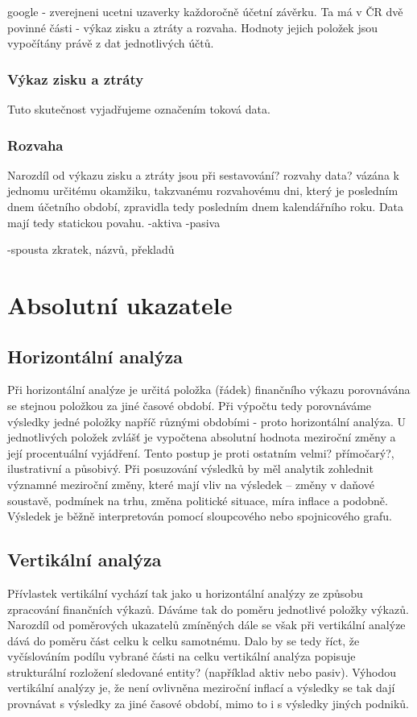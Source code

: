 google - zverejneni ucetni uzaverky
každoročně účetní závěrku. Ta má v ČR dvě povinné části - výkaz zisku a ztráty a rozvaha. Hodnoty jejich položek jsou vypočítány právě z dat jednotlivých účtů.
\subsubsection{Výkaz zisku a ztráty}
Tuto skutečnost vyjadřujeme označením toková data.

\subsubsection{Rozvaha}
Narozdíl od výkazu zisku a ztráty jsou při sestavování? rozvahy data? vázána k jednomu určitému okamžiku, takzvanému rozvahovému dni, který je posledním dnem účetního období, zpravidla tedy posledním dnem kalendářního roku. Data mají tedy statickou povahu.
-aktiva
-pasiva

-spousta zkratek, názvů, překladů
\section{Absolutní ukazatele}

\subsection{Horizontální analýza}
Při horizontální analýze je určitá položka (řádek) finančního výkazu porovnávána se stejnou položkou za jiné časové období. Při výpočtu tedy porovnáváme výsledky jedné položky napříč různými obdobími - proto horizontální analýza. U jednotlivých položek zvlášť je vypočtena absolutní hodnota meziroční změny a její procentuální vyjádření. Tento postup je proti ostatním velmi? přímočarý?, ilustrativní a působivý. Při posuzování výsledků by měl analytik zohlednit významné meziroční změny, které mají vliv na výsledek -- změny v daňové soustavě, podmínek na trhu, změna politické situace, míra inflace a podobně. Výsledek je běžně interpretován pomocí sloupcového nebo spojnicového grafu. 


\subsection{Vertikální analýza}
Přívlastek vertikální vychází tak jako u horizontální analýzy ze způsobu zpracování finančních výkazů. Dáváme tak do poměru jednotlivé položky výkazů. Narozdíl od poměrových ukazatelů zmíněných dále se však při vertikální analýze dává do poměru část celku k celku samotnému. Dalo by se tedy říct, že vyčíslováním podílu vybrané části na celku vertikální analýza popisuje strukturální rozložení sledované entity? (například aktiv nebo pasiv). 
Výhodou vertikální analýzy je, že není ovlivněna meziroční inflací a výsledky se tak dají provnávat s výsledky za jiné časové období, mimo to i s výsledky jiných podniků\cite{sedl}.
